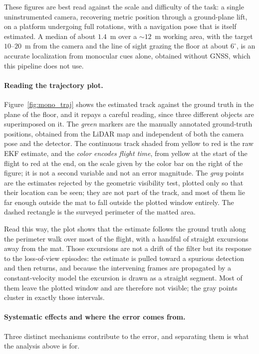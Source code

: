 These figures are best read against the scale and difficulty of the task: a single
uninstrumented camera, recovering metric position through a ground-plane lift, on
a platform undergoing full rotations, with a navigation pose that is itself
estimated. A median of about $1.4$~m over a $\sim 12$~m working area, with the
target $10$--$20$~m from the camera and the line of sight grazing the floor at
about $6^\circ$, is an accurate localization from monocular cues alone, obtained
without GNSS, which this pipeline does not use.

\paragraph*{Reading the trajectory plot.} Figure~\ref{fig:mono_traj} shows the
estimated track against the ground truth in the plane of the floor, and it repays
a careful reading, since three different objects are superimposed on it. The
\emph{green} markers are the manually annotated ground-truth positions, obtained
from the LiDAR map and independent of both the camera pose and the detector. The
continuous track shaded from yellow to red is the raw EKF estimate, and the
\emph{color encodes flight time}, from yellow at the start of the flight to red at
the end, on the scale given by the color bar on the right of the figure; it is not
a second variable and not an error magnitude. The \emph{gray} points are the estimates
rejected by the geometric visibility test, plotted only so that their location can
be seen; they are not part of the track, and most of them lie far enough outside
the mat to fall outside the plotted window entirely. The dashed rectangle is
the surveyed perimeter of the matted area.

Read this way, the plot shows that the estimate follows the ground truth along the
perimeter walk over most of the flight, with a handful of straight excursions away
from the mat. Those excursions are not a drift of the filter but its response to
the loss-of-view episodes: the estimate is pulled toward a spurious detection and
then returns, and because the intervening frames are propagated by a
constant-velocity model the excursion is drawn as a straight segment. Most of them
leave the plotted window and are therefore not visible; the gray points cluster in
exactly those intervals.

\paragraph*{Systematic effects and where the error comes from.} Three distinct
mechanisms contribute to the error, and separating them is what the analysis above
is for.

